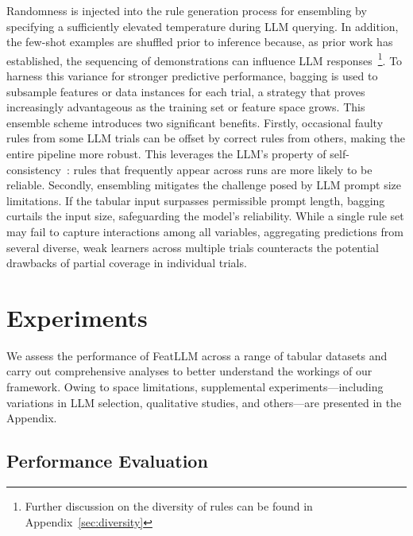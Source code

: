 Randomness is injected into the rule generation process for ensembling by specifying a sufficiently elevated temperature during LLM querying. In addition, the few-shot examples are shuffled prior to inference because, as prior work has established, the sequencing of demonstrations can influence LLM responses~\cite{lu2022fantastically}\footnote{Further discussion on the diversity of rules can be found in Appendix~\ref{sec:diversity}}. To harness this variance for stronger predictive performance, bagging is used to subsample features or data instances for each trial, a strategy that proves increasingly advantageous as the training set or feature space grows. This ensemble scheme introduces two significant benefits. Firstly, occasional faulty rules from some LLM trials can be offset by correct rules from others, making the entire pipeline more robust. This leverages the LLM's property of self-consistency~\cite{wang2022self}: rules that frequently appear across runs are more likely to be reliable. Secondly, ensembling mitigates the challenge posed by LLM prompt size limitations. If the tabular input surpasses permissible prompt length, bagging curtails the input size, safeguarding the model’s reliability. While a single rule set may fail to capture interactions among all variables, aggregating predictions from several diverse, weak learners across multiple trials counteracts the potential drawbacks of partial coverage in individual trials.

\section{Experiments}
We assess the performance of \textsf{FeatLLM} across a range of tabular datasets and carry out comprehensive analyses to better understand the workings of our framework. Owing to space limitations, supplemental experiments—including variations in LLM selection, qualitative studies, and others—are presented in the Appendix.

\subsection{Performance Evaluation}
